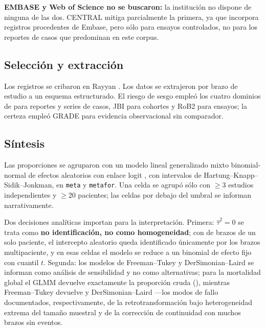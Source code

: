\documentclass[12pt]{article}
\begin{document}
\textbf{EMBASE y Web of Science no se buscaron:} la institución no dispone de
ninguna de las dos. CENTRAL mitiga parcialmente la primera, ya que incorpora
registros procedentes de Embase, pero sólo para ensayos controlados, no para los
reportes de casos que predominan en este corpus.

\subsection*{Selección y extracción}

Los registros se cribaron en Rayyan \parencite{Ouzzani2016_rayyan}. Los datos se
extrajeron por brazo de estudio a un esquema estructurado. El riesgo de sesgo
empleó los cuatro dominios de \textcite{Murad2018_casereports} para reportes y
series de casos, JBI \parencite{Munn2020_jbicaseseries} para cohortes y RoB2 para
ensayos; la certeza empleó GRADE para evidencia observacional sin comparador.

\subsection*{Síntesis}

Las proporciones se agruparon con un modelo lineal generalizado mixto
binomial-normal de efectos aleatorios con enlace logit
\parencite{Hamza2008_binomial,Nyaga2014_metaprop}, con intervalos de
Hartung--Knapp--Sidik--Jonkman, en \texttt{meta} y \texttt{metafor}. Una celda se
agrupó sólo con $\ge$3 estudios independientes y $\ge$20 pacientes; las celdas
por debajo del umbral se informan narrativamente.

Dos decisiones analíticas importan para la interpretación. Primera:
$\hat\tau^2=0$ se trata como \textbf{no identificación, no como homogeneidad};
con \SingleArmArms de \ArmsAnalysed brazos de un solo paciente, el intercepto
aleatorio queda identificado únicamente por los brazos multipaciente, y en esas
celdas el modelo se reduce a un binomial de efecto fijo con cuantil $t$. Segunda:
los modelos de Freeman--Tukey y DerSimonian--Laird se informan como análisis de
sensibilidad y no como alternativas; para la mortalidad global el GLMM devuelve
exactamente la proporción cruda (\MortOverallEst), mientras Freeman--Tukey
devuelve \MortOverallFT y DerSimonian--Laird \MortOverallDL ---los modos de
fallo documentados, respectivamente, de la retrotransformación bajo
heterogeneidad extrema del tamaño muestral \parencite{Schwarzer2019_doublearcsine}
y de la corrección de continuidad con muchos brazos sin eventos.
\end{document}

